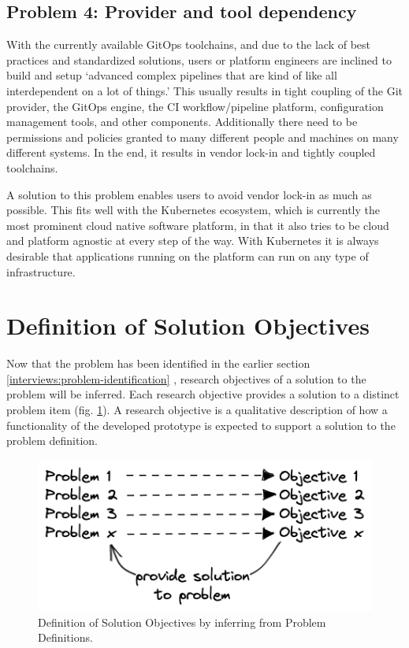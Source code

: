 \subsection{Problem 4: Provider and tool dependency}
\label{problem4}

With the currently available GitOps toolchains,
and due to the lack of best practices and standardized solutions,
users or platform engineers are inclined to build
and setup
\enquote*{advanced complex pipelines that are kind of like all interdependent on a lot of things.}
This usually results in tight coupling of the Git provider, the GitOps engine, the CI workflow/pipeline platform,
configuration management tools, and other components.
Additionally there need to be permissions and policies granted to many different people and
machines on many different systems.
In the end, it results in vendor lock-in and tightly coupled toolchains.

A solution to this problem enables users to avoid vendor lock-in as much as possible.
This fits well with the Kubernetes ecosystem, which is currently the most prominent
cloud native software platform,
in that it also tries to be cloud and platform agnostic at every step of the way.
With Kubernetes it is always desirable that applications running on the platform can
run on any type of infrastructure.











\section{Definition of Solution Objectives}\label{interviews:definitionSolutionObjectives}

Now that the problem has been identified in the earlier section
\ref{interviews:problem-identification} ,
research objectives of a solution to the problem will be inferred.
Each research objective provides a solution to a distinct problem item
(fig. \ref{fig:from-problem-to-objective-visualized}).
A research objective is a qualitative description of how a functionality
of the developed prototype is expected to support a solution to the problem definition.

\begin{figure}[h]
	\centering
	\includegraphics[width=0.55\linewidth]{assets/from-problem-to-objective-visualized.png}
	\caption{Definition of Solution Objectives by inferring from Problem Definitions.
	}
	\label{fig:from-problem-to-objective-visualized}	
\end{figure}

